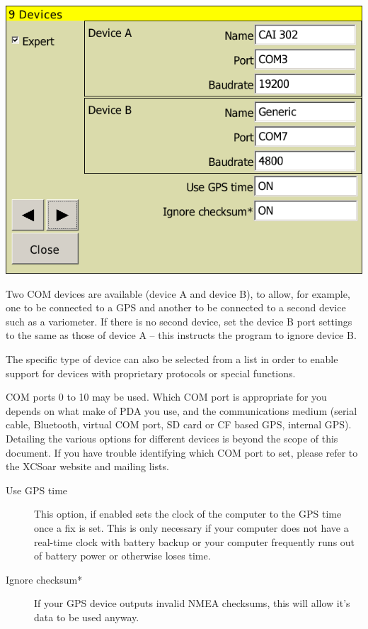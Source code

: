 \begin{center}
\includegraphics[angle=0,width=0.8\linewidth,keepaspectratio='true']{figures/config-devices.png}
\end{center}

Two COM devices are available (device A and device B), to allow, for
example, one to be connected to a GPS and another to be connected to a
second device such as a variometer.  If there is no second device, set
the device B port settings to the same as those of device A -- this
instructs the program to ignore device B.

The specific type of device can also be selected from a list in order
to enable support for devices with proprietary protocols or special
functions.

COM ports 0 to 10 may be used.  Which COM port is appropriate for you
depends on what make of PDA you use, and the communications medium
(serial cable, Bluetooth, virtual COM port, SD card or CF based GPS,
internal GPS).  Detailing the various options for different devices is
beyond the scope of this document.  If you have trouble identifying
which COM port to set, please refer to the XCSoar website and mailing
lists.

\begin{description}
\item[Use GPS time] This option, if enabled sets the clock of the computer to the GPS time once a fix is set.  
This is only necessary if your computer does not have a real-time clock with battery backup or your computer 
frequently runs out of battery power or otherwise loses time.
\item[Ignore checksum*] If your GPS device outputs invalid NMEA checksums, this will allow it's data to be used anyway.
\end{description}

